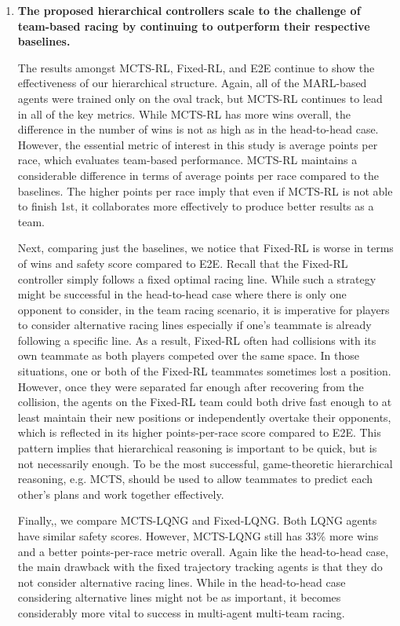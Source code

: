\begin{enumerate}[wide, labelindent=0pt, font=\bfseries]
\item \textbf{The proposed hierarchical controllers scale to the challenge of team-based racing by continuing to outperform their respective baselines.} 

The results amongst MCTS-RL, Fixed-RL, and E2E continue to show the effectiveness of our hierarchical structure. Again, all of the MARL-based agents were trained only on the oval track, but MCTS-RL continues to lead in all of the key metrics. While MCTS-RL has more wins overall, the difference in the number of wins is not as high as in the head-to-head case. However, the essential metric of interest in this study is average points per race, which evaluates team-based performance. MCTS-RL maintains a considerable difference in terms of average points per race compared to the baselines. The higher points per race imply that even if MCTS-RL is not able to finish 1st, it collaborates more effectively to produce better results as a team. 

Next, comparing just the baselines, we notice that Fixed-RL is worse in terms of wins and safety score compared to E2E. Recall that the Fixed-RL controller simply follows a fixed optimal racing line. While such a strategy might be successful in the head-to-head case where there is only one opponent to consider, in the team racing scenario, it is imperative for players to consider alternative racing lines especially if one's teammate is already following a specific line. As a result, Fixed-RL often had collisions with its own teammate as both players competed over the same space. In those situations, one or both of the Fixed-RL teammates sometimes lost a position. However, once they were separated far enough after recovering from the collision, the agents on the Fixed-RL team could both drive fast enough to at least maintain their new positions or independently overtake their opponents, which is reflected in its higher points-per-race score compared to E2E. This pattern implies that hierarchical reasoning is important to be quick, but is not necessarily enough. To be the most successful, game-theoretic hierarchical reasoning, e.g. MCTS, should be used to allow teammates to predict each other's plans and work together effectively. 

Finally,, we compare MCTS-LQNG and Fixed-LQNG. Both LQNG agents have similar safety scores. However, MCTS-LQNG still has 33\% more wins and a better points-per-race metric overall. Again like the head-to-head case, the main drawback with the fixed trajectory tracking agents is that they do not consider alternative racing lines. While in the head-to-head case considering alternative lines might not be as important, it becomes considerably more vital to success in multi-agent multi-team racing.


\end{enumerate}
